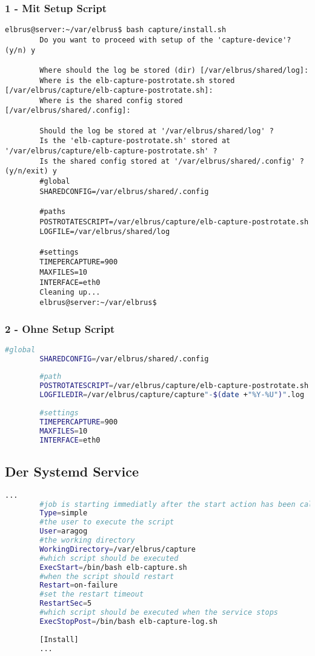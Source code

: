 \documentclass{article}
\begin{document}
	\subsubsection{1 - Mit Setup Script}
	\begin{lstlisting}[caption={Ausführen des 'install.sh' Scripts.}, breaklines=true,]
		elbrus@server:~/var/elbrus$ bash capture/install.sh
		Do you want to proceed with setup of the 'capture-device'? (y/n) y
		
		Where should the log be stored (dir) [/var/elbrus/shared/log]:
		Where is the elb-capture-postrotate.sh stored [/var/elbrus/capture/elb-capture-postrotate.sh]:
		Where is the shared config stored [/var/elbrus/shared/.config]:
		
		Should the log be stored at '/var/elbrus/shared/log' ?
		Is the 'elb-capture-postrotate.sh' stored at '/var/elbrus/capture/elb-capture-postrotate.sh' ?
		Is the shared config stored at '/var/elbrus/shared/.config' ? (y/n/exit) y
		#global
		SHAREDCONFIG=/var/elbrus/shared/.config
		
		#paths
		POSTROTATESCRIPT=/var/elbrus/capture/elb-capture-postrotate.sh
		LOGFILE=/var/elbrus/shared/log
		
		#settings
		TIMEPERCAPTURE=900
		MAXFILES=10
		INTERFACE=eth0
		Cleaning up...
		elbrus@server:~/var/elbrus$
	\end{lstlisting}
	
	\subsubsection{2 - Ohne Setup Script}
	\lstset{style=files}
	\begin{lstlisting}[caption={Anhand von '.env.example' eigene '.env' Datei anlegen.}, language=bash]
		#global
		SHAREDCONFIG=/var/elbrus/shared/.config
		
		#path
		POSTROTATESCRIPT=/var/elbrus/capture/elb-capture-postrotate.sh
		LOGFILEDIR=/var/elbrus/capture/capture"-$(date +"%Y-%U")".log
		
		#settings
		TIMEPERCAPTURE=900
		MAXFILES=10
		INTERFACE=eth0
	\end{lstlisting}

	\newpage
	\subsection[systemd service]{Der Systemd Service}
	\begin{lstlisting}[caption={capture.service.example - Die Variable 'WorkingDirectory', Die Variable 'User' sowie die Variable 'ExecStopPost' anpassen.},language=bash ,keywords={WorkingDirectory, User, ExecStopPost}, keywordstyle=\color{red}, firstnumber=3]
		...
		#job is starting immediatly after the start action has been called
		Type=simple
		#the user to execute the script
		User=aragog
		#the working directory
		WorkingDirectory=/var/elbrus/capture
		#which script should be executed
		ExecStart=/bin/bash elb-capture.sh
		#when the script should restart
		Restart=on-failure
		#set the restart timeout
		RestartSec=5
		#which script should be executed when the service stops
		ExecStopPost=/bin/bash elb-capture-log.sh
		
		[Install]
		...
	\end{lstlisting}
	
\end{document}
